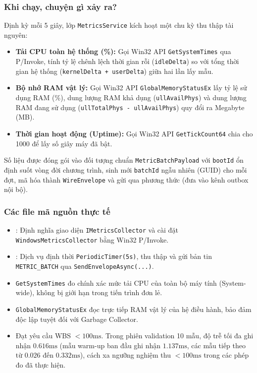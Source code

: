 \documentclass[12pt,a4paper]{article}
\begin{document}
\subsubsection{Khi chạy, chuyện gì xảy ra?}
Định kỳ mỗi 5 giây, lớp \texttt{MetricsService} kích hoạt một chu kỳ thu thập tài nguyên:
\begin{itemize}
  \item \textbf{Tải CPU toàn hệ thống (\%):} Gọi Win32 API \texttt{GetSystemTimes} qua P/Invoke, tính tỷ lệ chênh lệch thời gian rỗi (\texttt{idleDelta}) so với tổng thời gian hệ thống (\texttt{kernelDelta + userDelta}) giữa hai lần lấy mẫu.
  \item \textbf{Bộ nhớ RAM vật lý:} Gọi Win32 API \texttt{GlobalMemoryStatusEx} lấy tỷ lệ sử dụng RAM (\%), dung lượng RAM khả dụng (\texttt{ullAvailPhys}) và dung lượng RAM đang sử dụng (\texttt{ullTotalPhys - ullAvailPhys}) quy đổi ra Megabyte (MB).
  \item \textbf{Thời gian hoạt động (Uptime):} Gọi Win32 API \texttt{GetTickCount64} chia cho 1000 để lấy số giây máy đã bật.
\end{itemize}
Số liệu được đóng gói vào đối tượng chuẩn \texttt{MetricBatchPayload} với \texttt{bootId} ổn định suốt vòng đời chương trình, sinh mới \texttt{batchId} ngẫu nhiên (GUID) cho mỗi đợt, mã hóa thành \texttt{WireEnvelope} và gửi qua phương thức  (đưa vào kênh outbox nội bộ).

\subsubsection{Các file mã nguồn thực tế}
\begin{itemize}
  \item {}: Định nghĩa giao diện \texttt{IMetricsCollector} và cài đặt \texttt{WindowsMetricsCollector} bằng Win32 P/Invoke.
  \item {}: Dịch vụ định thời \texttt{PeriodicTimer(5s)}, thu thập và gửi bản tin \texttt{METRIC\_BATCH} qua \texttt{SendEnvelopeAsync(...)}.
\end{itemize}

\begin{orientationbox}
\begin{itemize}[leftmargin=1.5em, itemsep=1pt]
  \item \texttt{GetSystemTimes} đo chính xác mức tải CPU của toàn bộ máy tính (System-wide), không bị giới hạn trong tiến trình đơn lẻ.
  \item \texttt{GlobalMemoryStatusEx} đọc trực tiếp RAM vật lý của hệ điều hành, bảo đảm độc lập tuyệt đối với Garbage Collector.
  \item Đạt yêu cầu WBS $< 100\text{ms}$. Trong phiên validation 10 mẫu, độ trễ tối đa ghi nhận $0.616\text{ms}$ (mẫu warm-up ban đầu ghi nhận $1.137\text{ms}$, các mẫu tiếp theo từ $0.026$ đến $0.332\text{ms}$), cách xa ngưỡng nghiệm thu $< 100\text{ms}$ trong các phép đo đã thực hiện.
\end{itemize}
\end{orientationbox}
\end{document}
